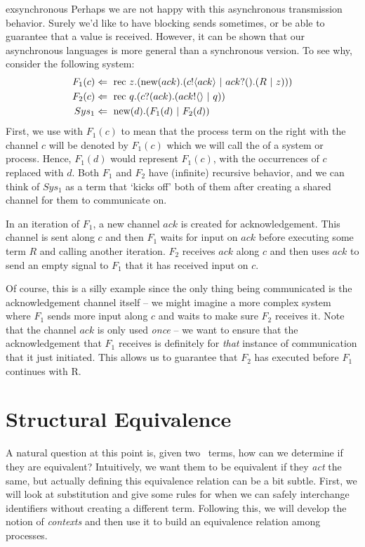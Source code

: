 	\begin{example}{exsynchronous}
	 Perhaps we are not happy with this asynchronous transmission behavior.  Surely we'd like to have blocking sends sometimes, or be able to guarantee that a value is received.  However, it can be shown that our asynchronous languages is more general than a synchronous version.  To see why, consider the following system:
	\begin{align}
		F_1(c) & \Leftarrow\  \text{rec }{z}. (\text{new}({ack}).({c}!\langle{ack}\rangle \ |\  {ack}?({}).(R \ |\  z)))\\
		F_2(c) & \Leftarrow\  \text{rec }{q}. ({c}?({ack}).({ack}!\langle{}\rangle \ |\  q)) \\
		Sys_1 & \Leftarrow\  \text{new}({d}).(F_1(d) \ |\  F_2(d))
	\end{align}
	First, we use \pdef with $F_1(c)$ to mean that the process term on the right with the channel $c$ will be denoted by $F_1(c)$ which we will call the  of a system or process.  Hence, $F_1(d)$ would represent $F_1(c)$, with the occurrences of $c$ replaced with $d$.  Both $F_1$ and $F_2$ have (infinite) recursive behavior, and we can think of $Sys_1$ as a term that `kicks off' both of them after creating a shared channel for them to communicate on.  
	
	In an iteration of $F_1$, a new channel $ack$ is created for acknowledgement.  This channel is sent along $c$ and then $F_1$ waits for input on $ack$ before executing some term $R$ and calling another iteration.  $F_2$ receives $ack$ along $c$ and then uses $ack$ to send an empty signal to $F_1$ that it has received input on $c$.  
	
	Of course, this is a silly example since the only thing being communicated is the acknowledgement channel itself -- we might imagine a more complex system where $F_1$ sends more input along $c$ and waits to make sure $F_2$ receives it.  Note that the channel $ack$ is only used \emph{once} -- we want to ensure that the acknowledgement that $F_1$ receives is definitely for \emph{that} instance of communication that it just initiated.  This allows us to guarantee that $F_2$ has executed before $F_1$ continues with R.  \end{example}

\section{Structural Equivalence}
	A natural question at this point is, given two \picalc\ terms, how can we determine if they are equivalent?  Intuitively, we want them to be equivalent if they \emph{act} the same, but actually defining this equivalence relation can be a bit subtle.  First, we will look at substitution and give some rules for when we can safely interchange identifiers without creating a different term. Following this, we will develop the notion of \emph{contexts} and then use it to build an equivalence relation among processes.
